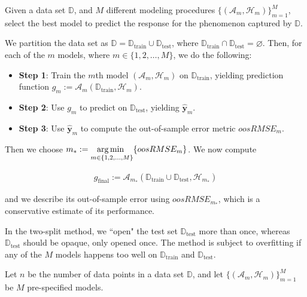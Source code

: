 \documentclass[12pt]{article}
\newcommand{\train}{\text{train}}
\newcommand{\test}{\text{test}}
\newcommand{\Dtrain}{\mathbb{D}_\train}
\newcommand{\Dtest}{\mathbb{D}_\test}
\begin{document}
\begin{enumerate}


Given a data set $\mathbb{D}$, and $M$ different modeling procedures
$\{(\mathcal{A}_m, \mathcal{H}_m)\}_{m=1}^{M}$, select the best model
to predict the response for the phenomenon captured by $\mathbb{D}$.


We partition the data set as
$\mathbb{D} = \Dtrain \cup \Dtest$, where $\Dtrain \cap \Dtest = \varnothing$.
Then, for each of the $m$ models, where $m\in \{1,2,\ldots,M\}$, we do the following:
\begin{itemize}
	\item \textbf{Step 1}: Train the $m$th model $(\mathcal{A}_m, \mathcal{H}_m)$
	on $\Dtrain$, yielding prediction function $g_m := \mathcal{A}_m(\Dtrain, \mathcal{H}_m)$.
	\item \textbf{Step 2}: Use $g_m$ to predict on $\Dtest$, yielding $\hat{\bm{y}}_m$.
	\item \textbf{Step 3}: Use $\hat{\bm{y}}_m$ to compute the out-of-sample error
	metric $oosRMSE_m$.
\end{itemize}

Then we choose $m_* := \underset{m\in \{1,2,\ldots,M\}}{\operatorname*{arg\,min~}} \{ oosRMSE_m\}$.
We now compute

\begin{align*}
	g_{\text{final}} := \mathcal{A}_{m_*}(\Dtrain \cup \Dtest, \mathcal{H}_{m_*})
\end{align*}

and we describe its out-of-sample error using $oosRMSE_{m_*}$, which is a conservative
estimate of its performance.


In the two-split method, we ``open" the test set $\Dtest$ more than once,
whereas $\Dtest$ should be opaque, only opened once. The method is subject
to overfitting if any of the $M$ models happens too well on $\Dtrain$ and $\Dtest$.


Let $n$ be the number of data points in a data set $\mathbb{D}$, and let
$\{(\mathcal{A}_m,\mathcal{H}_m)\}_{m=1}^{M}$ be $M$ pre-specified models.


\end{enumerate}
\end{document}

